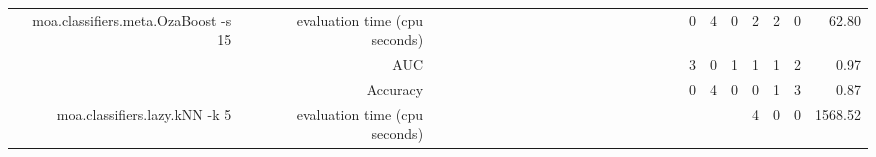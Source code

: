\documentclass{article}
\providecommand{\tabularnewline}{\\}
\begin{document}
\begin{sidewaystable}
\begin{tabular}{|r|r|rrrrrrrr|r|r|r|r|r|r|r|r|r|r|r|r|r|r|r|r|r|}
 \cline{1-2} \cline{18-27}
\multirow{3}{*}{moa.classifiers.meta.OzaBoost -s 15} & evaluation time (cpu seconds) & \multicolumn{1}{r}{} & \multicolumn{1}{r}{} & \multicolumn{1}{r}{} & \multicolumn{1}{r}{} & \multicolumn{1}{r}{} & \multicolumn{1}{r}{} & \multicolumn{1}{r}{} & \multicolumn{1}{r}{} & \multicolumn{1}{r}{} & \multicolumn{1}{r}{} & \multicolumn{1}{r}{} & \multicolumn{1}{r}{} & \multicolumn{1}{r}{} & \multicolumn{1}{r}{} & \multicolumn{1}{r}{} & \multicolumn{1}{r}{} & \multicolumn{1}{r}{} & \multicolumn{1}{r|}{} & \multicolumn{1}{r|}{0} & \multicolumn{1}{r|}{4} & \multicolumn{1}{r|}{0} & \multicolumn{1}{r|}{2} & \multicolumn{1}{r|}{2} & \multicolumn{1}{r|}{0} & 62.80\tabularnewline
 \cline{2-2} \cline{21-27}
 & AUC & \multicolumn{1}{r}{} & \multicolumn{1}{r}{} & \multicolumn{1}{r}{} & \multicolumn{1}{r}{} & \multicolumn{1}{r}{} & \multicolumn{1}{r}{} & \multicolumn{1}{r}{} & \multicolumn{1}{r}{} & \multicolumn{1}{r}{} & \multicolumn{1}{r}{} & \multicolumn{1}{r}{} & \multicolumn{1}{r}{} & \multicolumn{1}{r}{} & \multicolumn{1}{r}{} & \multicolumn{1}{r}{} & \multicolumn{1}{r}{} & \multicolumn{1}{r}{} & \multicolumn{1}{r|}{} & \multicolumn{1}{r|}{3} & \multicolumn{1}{r|}{0} & \multicolumn{1}{r|}{1} & \multicolumn{1}{r|}{1} & \multicolumn{1}{r|}{1} & \multicolumn{1}{r|}{2} & 0.97\tabularnewline
 \cline{2-2} \cline{21-27}
 & Accuracy & \multicolumn{1}{r}{} & \multicolumn{1}{r}{} & \multicolumn{1}{r}{} & \multicolumn{1}{r}{} & \multicolumn{1}{r}{} & \multicolumn{1}{r}{} & \multicolumn{1}{r}{} & \multicolumn{1}{r}{} & \multicolumn{1}{r}{} & \multicolumn{1}{r}{} & \multicolumn{1}{r}{} & \multicolumn{1}{r}{} & \multicolumn{1}{r}{} & \multicolumn{1}{r}{} & \multicolumn{1}{r}{} & \multicolumn{1}{r}{} & \multicolumn{1}{r}{} & \multicolumn{1}{r|}{} & \multicolumn{1}{r|}{0} & \multicolumn{1}{r|}{4} & \multicolumn{1}{r|}{0} & \multicolumn{1}{r|}{0} & \multicolumn{1}{r|}{1} & \multicolumn{1}{r|}{3} & 0.87\tabularnewline
 \cline{1-2} \cline{21-27}
\multirow{3}{*}{moa.classifiers.lazy.kNN -k 5} & evaluation time (cpu seconds) & \multicolumn{1}{r}{} & \multicolumn{1}{r}{} & \multicolumn{1}{r}{} & \multicolumn{1}{r}{} & \multicolumn{1}{r}{} & \multicolumn{1}{r}{} & \multicolumn{1}{r}{} & \multicolumn{1}{r}{} & \multicolumn{1}{r}{} & \multicolumn{1}{r}{} & \multicolumn{1}{r}{} & \multicolumn{1}{r}{} & \multicolumn{1}{r}{} & \multicolumn{1}{r}{} & \multicolumn{1}{r}{} & \multicolumn{1}{r}{} & \multicolumn{1}{r}{} & \multicolumn{1}{r}{} & \multicolumn{1}{r}{} & \multicolumn{1}{r}{} & \multicolumn{1}{r|}{} & \multicolumn{1}{r|}{4} & \multicolumn{1}{r|}{0} & \multicolumn{1}{r|}{0} & 1568.52\tabularnewline

\end{tabular}
\end{sidewaystable}
\end{document}
